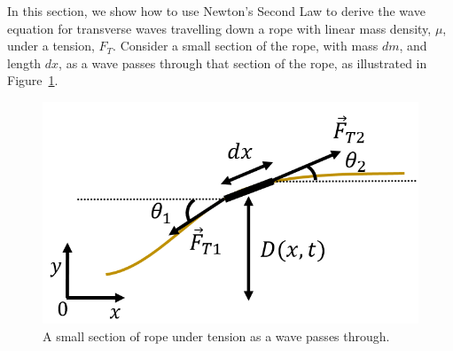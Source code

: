In this section, we show how to use Newton's Second Law to derive the wave equation for transverse waves travelling down a rope with linear mass density, $\mu$, under a tension, $F_T$. Consider a small section of the rope, with mass $dm$, and length $dx$, as a wave passes through that section of the rope, as illustrated in Figure~\ref{fig:waves:weqn}.

\begin{figure}[!htbp]
\centering
\includegraphics[width=0.55\linewidth]{files/weqn-7b90038e7759d28c72dec85d39be882d.png}
\caption[]{A small section of rope under tension as a wave passes through.}
\label{fig:waves:weqn}
\end{figure}

